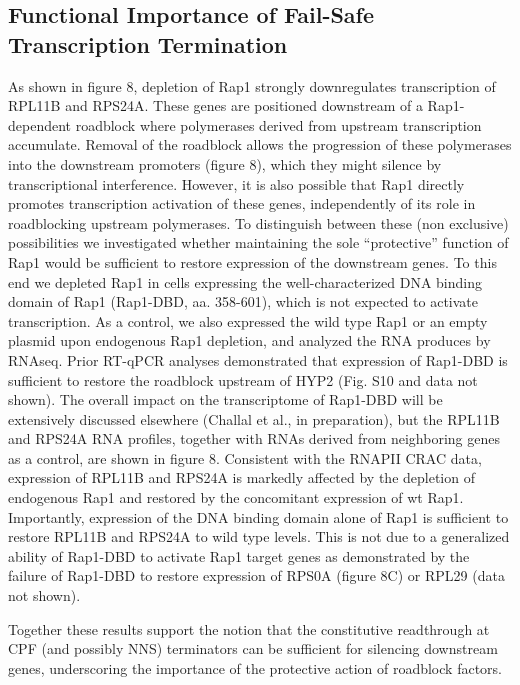 \singlespacing
\subsection*{Functional Importance of Fail-Safe Transcription Termination }
\doublespacing

As shown in figure 8, depletion of Rap1 strongly downregulates transcription of RPL11B and RPS24A. These genes are positioned downstream of a Rap1-dependent roadblock where polymerases derived from upstream transcription accumulate. Removal of the roadblock allows the progression of these polymerases into the downstream promoters (figure 8), which they might silence by transcriptional interference. However, it is also possible that Rap1 directly promotes transcription activation of these genes, independently of its role in roadblocking upstream polymerases. To distinguish between these (non exclusive) possibilities we investigated whether maintaining the sole “protective” function of Rap1 would be sufficient to restore expression of the downstream genes. To this end we depleted Rap1 in cells expressing the well-characterized DNA binding domain of Rap1 (Rap1-DBD, aa. 358-601), which is not expected to activate transcription. As a control, we also expressed the wild type Rap1 or an empty plasmid upon endogenous Rap1 depletion, and analyzed the RNA produces by RNAseq. Prior RT-qPCR analyses demonstrated that expression of Rap1-DBD is sufficient to restore the roadblock upstream of HYP2 (Fig. S10 and data not shown). The overall impact on the transcriptome of Rap1-DBD will be extensively discussed elsewhere (Challal et al., in preparation), but the RPL11B and RPS24A RNA profiles, together with RNAs derived from neighboring genes as a control, are shown in figure 8. Consistent with the RNAPII CRAC data, expression of RPL11B and RPS24A is markedly affected by the depletion of endogenous Rap1 and restored by the concomitant expression of wt Rap1. Importantly, expression of the DNA binding domain alone of Rap1 is sufficient to restore RPL11B and RPS24A to wild type levels. This is not due to a generalized ability of Rap1-DBD to activate Rap1 target genes as demonstrated by the failure of Rap1-DBD to restore expression of RPS0A (figure 8C) or RPL29 (data not shown).

Together these results support the notion that the constitutive readthrough at CPF (and possibly NNS) terminators can be sufficient for silencing downstream genes, underscoring the importance of the protective action of roadblock factors.  

